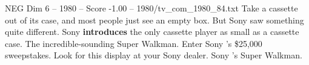 \begin{textsample}{NEG Dim 6 – 1980 – Score -1.00 – 1980/tv\_com\_1980\_84.txt}  \label{ex:f6_neg_037}
Take a cassette out of its case, and most people just see an empty box.
But Sony saw something quite different.
Sony \textbf{introduces} the only cassette player as small as a cassette case.
The incredible-sounding Super Walkman.
Enter Sony 's \$25,000 sweepstakes.
Look for this display at your Sony dealer.
Sony 's Super Walkman.

\end{textsample}
